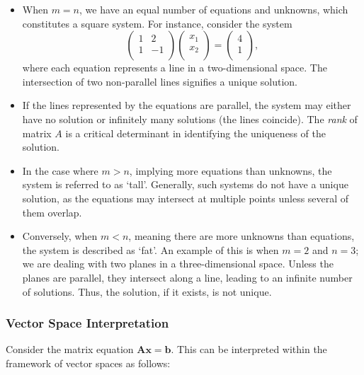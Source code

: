 \begin{itemize}
    \item When \(m = n\), we have an equal number of equations and unknowns, which constitutes a square system. For instance, consider the system
    \[
    \begin{pmatrix}
    1 & 2 \\
    1 & -1 \\
    \end{pmatrix}
    \begin{pmatrix}
    x_1 \\
    x_2 \\
    \end{pmatrix}
    =
    \begin{pmatrix}
    4 \\
    1 \\
    \end{pmatrix},
    \]
    where each equation represents a line in a two-dimensional space. The intersection of two non-parallel lines signifies a unique solution.

    \item If the lines represented by the equations are parallel, the system may either have no solution or infinitely many solutions (the lines coincide). The \emph{rank} of matrix \(A\) is a critical determinant in identifying the uniqueness of the solution.

    \item In the case where \(m > n\), implying more equations than unknowns, the system is referred to as `tall'. Generally, such systems do not have a unique solution, as the equations may intersect at multiple points unless several of them overlap.

    \item Conversely, when \(m < n\), meaning there are more unknowns than equations, the system is described as `fat'. An example of this is when \(m = 2\) and \(n = 3\); we are dealing with two planes in a three-dimensional space. Unless the planes are parallel, they intersect along a line, leading to an infinite number of solutions. Thus, the solution, if it exists, is not unique.
\end{itemize}
\subsubsection*{Vector Space Interpretation}

Consider the matrix equation \( \mathbf{Ax} = \mathbf{b} \). This can be interpreted within the framework of vector spaces as follows:

